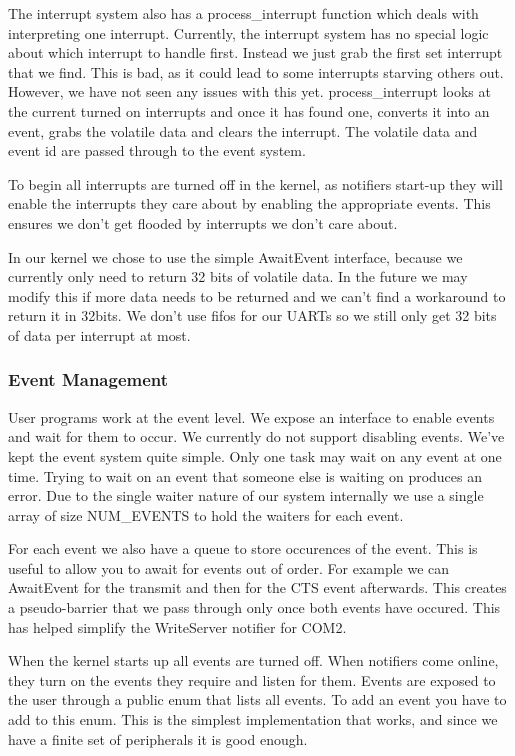 \documentclass{article}
\begin{document}
The interrupt system also has a process\_interrupt function which deals with interpreting one interrupt. Currently, the interrupt system has no special logic about which interrupt to handle first. Instead we just grab the first set interrupt that we find. This is bad, as it could lead to some interrupts starving others out. However, we have not seen any issues with this yet. process\_interrupt looks at the current turned on interrupts and once it has found one, converts it into an event, grabs the volatile data and clears the interrupt. The volatile data and event id are passed through to the event system.

To begin all interrupts are turned off in the kernel, as notifiers start-up they will enable the interrupts they care about by enabling the appropriate events. This ensures we don't get flooded by interrupts we don't care about.

In our kernel we chose to use the simple AwaitEvent interface, because we currently only need to return 32 bits of volatile data. In the future we may modify this if more data needs to be returned and we can't find a workaround to return it in 32bits. We don't use fifos for our UARTs so we still only get 32 bits of data per interrupt at most.

\subsubsection{Event Management}

User programs work at the event level. We expose an interface to enable events and wait for them to occur. We currently do not support disabling events. We've kept the event system quite simple. Only one task may wait on any event at one time. Trying to wait on an event that someone else is waiting on produces an error. Due to the single waiter nature of our system internally we use a single array of size NUM\_EVENTS to hold the waiters for each event. 

For each event we also have a queue to store occurences of the event. This is useful to allow you to await for events out of order. For example we can AwaitEvent for the transmit and then for the CTS event afterwards. This creates a pseudo-barrier that we pass through only once both events have occured. This has helped simplify the WriteServer notifier for COM2.

When the kernel starts up all events are turned off. When notifiers come online, they turn on the events they require and listen for them. Events are exposed to the user through a public enum that lists all events. To add an event you have to add to this enum. This is the simplest implementation that works, and since we have a finite set of peripherals it is good enough.
\end{document}
